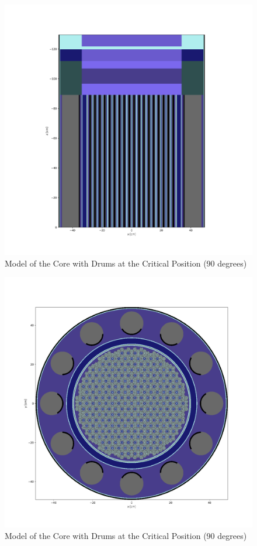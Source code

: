 \documentclass[8pt,a5paper]{article}
\begin{document}
\begin{figure}[h!]
    \centering
    \includegraphics[width=1\linewidth]{figures/xz0_Reactor.png}
    \caption{Model of the Core with Drums at the Critical Position (90 degrees)}
    \label{fig:Figure 1}
\end{figure}

\begin{figure}[h!]
    \centering
    \includegraphics[width=1\linewidth]{figures/xy0_Reactor.png}
    \caption{Model of the Core with Drums at the Critical Position (90 degrees)}
    \label{fig:Figure 2}
\end{figure}
\end{document}

